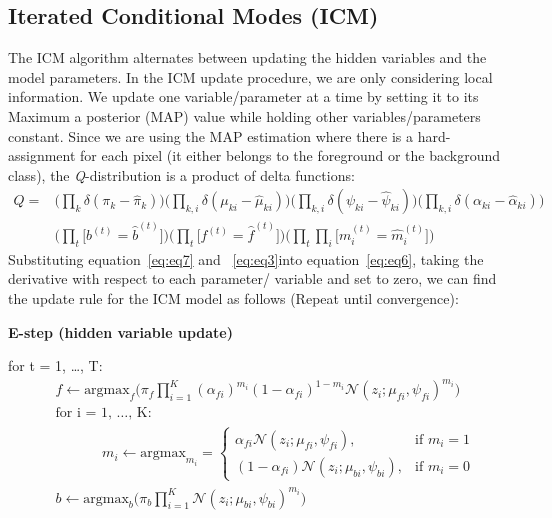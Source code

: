 \documentclass{article} %
\begin{document}
\subsection{Iterated Conditional Modes (ICM)}
\label{icm}
The ICM algorithm alternates between updating the hidden variables and the model parameters. In the ICM update procedure, we are only considering local information. We update one variable/parameter at a time by setting it to its Maximum a posterior (MAP) value while holding other variables/parameters constant. Since we are using the MAP estimation where there is a hard-assignment for each pixel (it either belongs to the foreground or the background class), the \textit{Q}-distribution is a product of delta functions:
\begin{equation} \label{eq:eq7}
\begin{split}
Q = &\Bigg( \prod_{k}\delta(\pi_k-\hat{\pi}_k) \Bigg) \Bigg( \prod_{k,i}\delta(\mu_{ki}-\hat{\mu}_{ki}) \Bigg)\Bigg( \prod_{k,i}\delta(\psi_{ki}-\hat{\psi}_{ki}) \Bigg)\Bigg( \prod_{k,i}\delta(\alpha_{ki}-\hat{\alpha}_{ki}) \Bigg) \\
&\Bigg( \prod_{t}\Big[b^{(t)} = \hat{b}^{(t)}\Big] \Bigg)\Bigg( \prod_{t}\Big[f^{(t)} = \hat{f}^{(t)}\Big] \Bigg)\Bigg( \prod_{t}\prod_{i}\Big[m_i^{(t)} = \hat{m}_i^{(t)}\Big] \Bigg)
\end{split}
\end{equation}
Substituting equation~\ref{eq:eq7} and ~\ref{eq:eq3}into equation~\ref{eq:eq6}, taking the derivative with respect to each parameter/ variable and set to zero, we can find the update rule for the ICM model as follows (Repeat until convergence):

\textbf{E-step (hidden variable update)}

for t = 1, \ldots , T:
\begin{align*} 
&f \leftarrow \text{argmax}_{f}\Bigg(\pi_f \prod_{i=1}^K {(\alpha_{fi})}^{m_{i}} {(1-\alpha_{fi})}^{1-m_{i}}\mathcal{N}(z_i;\mu_{fi},\psi_{fi})^{m_{i}}\Bigg)\\
&\text{for i = 1, \ldots , K: } \\
& \text{ }\text{ }\text{ }\text{ }\text{ }m_i \leftarrow \text{argmax}_{m_i}=\begin{cases}
\alpha_{fi}\mathcal{N}(z_i;\mu_{fi},\psi_{fi}), & \text{if $m_i = 1$}\\
(1-\alpha_{fi})\mathcal{N}(z_i;\mu_{bi},\psi_{bi}), & \text{if $m_i = 0$}
\end{cases} \\
&b \leftarrow \text{argmax}_{b}\Bigg(\pi_b \prod_{i=1}^K \mathcal{N}(z_i;\mu_{bi},\psi_{bi})^{m_{i}}\Bigg)
\end{align*} 
\end{document}
